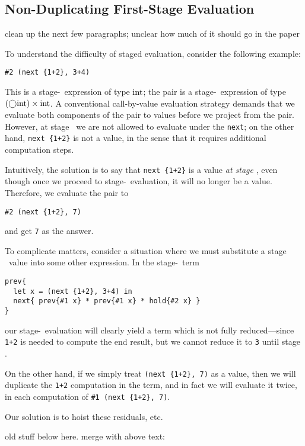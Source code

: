 \subsection{Non-Duplicating First-Stage Evaluation}

\TODO clean up the next few paragraphs; unclear how much of it should go in the
paper

To understand the difficulty of staged evaluation, consider the following
example:
\begin{lstlisting}
#2 (next {1+2}, 3+4)
\end{lstlisting}
This is a stage-\bbone\ expression of type ${\rm int}$; the pair is a stage-\bbone\
expression of type $(\bigcirc{\rm int})\times{\rm int}$. A conventional call-by-value
evaluation strategy demands that we evaluate both components of the pair to
values before we project from the pair. However, at stage \bbone\ we are not
allowed to evaluate under the \verb|next|; on the other hand, \verb|next {1+2}|
is not a value, in the sense that it requires additional computation steps.

Intuitively, the solution is to say that \verb|next {1+2}| is a value \emph{at
stage \bbone}, even though once we proceed to stage-\bbtwo\ evaluation, it will
no longer be a value. Therefore, we evaluate the pair to
\begin{lstlisting}
#2 (next {1+2}, 7)
\end{lstlisting}
and get \verb|7| as the answer.

To complicate matters, consider a situation where we must substitute a stage
\bbone\ value into some other expression. In the stage-\bbtwo\ term
\begin{lstlisting} 
prev{
  let x = (next {1+2}, 3+4) in
  next{ prev{#1 x} * prev{#1 x} * hold{#2 x} }
}
\end{lstlisting}
our stage-\bbone\ evaluation will clearly yield a term which is not fully
reduced---since \verb|1+2| is needed to compute the end result, but we cannot
reduce it to \verb|3| until stage \bbtwo.

On the other hand, if we simply treat \verb|(next {1+2}, 7)| as a value, then we
will duplicate the \verb|1+2| computation in the term, and in fact we will
evaluate it twice, in each computation of \verb|#1 (next {1+2}, 7)|.

Our solution is to hoist these residuals, etc.

\vspace{2em}
\TODO old stuff below here. merge with above text:

